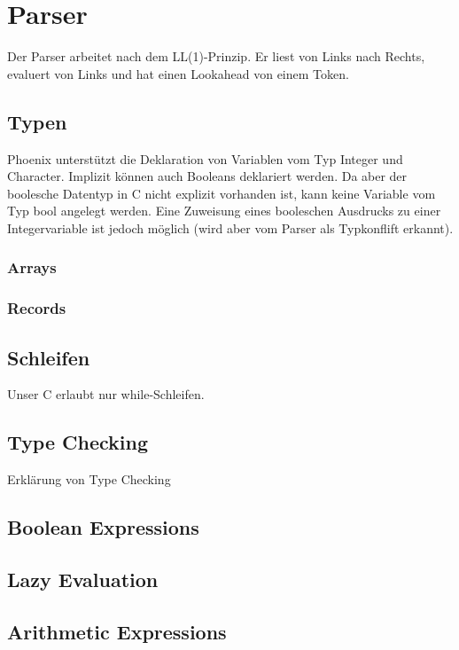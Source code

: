 \documentclass{article}
\begin{document}
	\section{Parser}
	Der Parser arbeitet nach dem LL(1)-Prinzip. Er liest von Links nach Rechts, evaluert von Links und hat einen Lookahead von einem Token.

	\subsection{Typen}

	Phoenix unterstützt die Deklaration von Variablen vom Typ Integer und Character.
	Implizit können auch Booleans deklariert werden.
	Da aber der boolesche Datentyp in C nicht explizit vorhanden ist, kann keine Variable vom Typ bool angelegt werden.
	Eine Zuweisung eines booleschen Ausdrucks zu einer Integervariable ist jedoch möglich (wird aber vom Parser als Typkonflift erkannt).

	\subsubsection{Arrays}

	\subsubsection{Records}

	\subsection{Schleifen}

	Unser C erlaubt nur while-Schleifen.

	\subsection{Type Checking}
	Erklärung von Type Checking

	\subsection{Boolean Expressions}

	\subsection{Lazy Evaluation}

	\subsection{Arithmetic Expressions}
\end{document}
